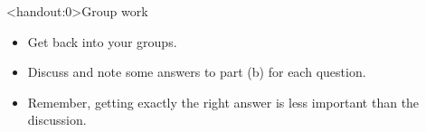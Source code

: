 \documentclass[xcolor=table, aspectratio=169, bigger]{beamer}
\begin{document}
\begin{frame}<handout:0>{Group work}
\begin{block}{}
\begin{itemize}
\item Get back into your groups.
\item Discuss and note some answers to part (b) for each question.
\item Remember, getting exactly the right answer is less important than the discussion.
\end{itemize}
\end{block}
\end{frame}
\end{document}
